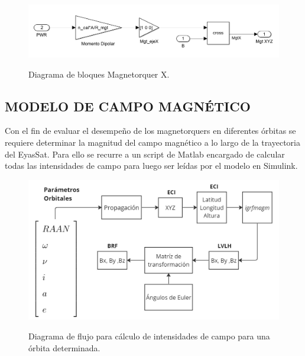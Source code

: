 
\begin{figure}[h]
	\begin{center}
		\includegraphics[scale=0.4]{imagenes/modelo_dinamico/bloquesMgt.PNG}\\
	\end{center}
	\caption{Diagrama de bloques Magnetorquer X.}
	\label{fig:bloquesMgt}
	\textit{}
\end{figure}


\subsection{MODELO DE CAMPO MAGNÉTICO}

Con el fin de evaluar el desempeño de los magnetorquers en diferentes órbitas se requiere determinar la magnitud del campo magnético a lo largo de la trayectoria del EyasSat. Para ello se recurre a un script de Matlab encargado de calcular todas las intensidades de campo para luego ser leídas por el modelo en Simulink.

\begin{figure}[!ht]
	\begin{center}
		\includegraphics[scale=0.4]{imagenes/modelo_dinamico/flujo_campo.png}\\
	\end{center}
	\caption{Diagrama de flujo para cálculo de intensidades de campo para una órbita determinada.}
	\label{fig:flujoCampo}
	\textit{}
\end{figure}


